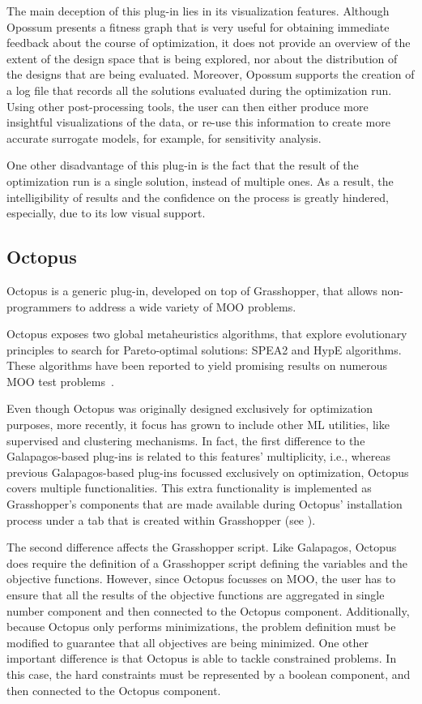 The main deception of this plug-in lies in its visualization features. Although Opossum presents a fitness graph that is very useful for obtaining immediate feedback about the course of optimization, it does not provide an overview of the extent of the design space that is being explored, nor about the distribution of the designs that are being evaluated. Moreover, Opossum supports the creation of a log file that records all the solutions evaluated during the optimization run. Using other post-processing tools, the user can then either produce more insightful visualizations of the data, or re-use this information to create more accurate surrogate models, for example, for sensitivity analysis.

One other disadvantage of this plug-in is the fact that the result of the optimization run is a single solution, instead of multiple ones. As a result, the intelligibility of results and the confidence on the process is greatly hindered, especially, due to its low visual support. 

\subsection{Octopus}

Octopus \cite{OCTOPUS} is a generic plug-in, developed on top of Grasshopper, that allows non-programmers to address a wide variety of \ac{MOO} problems. 

Octopus exposes two global metaheuristics algorithms, that explore evolutionary principles to search for Pareto-optimal solutions: \ac{SPEA2} and \ac{HypE} algorithms. These algorithms have been reported to yield promising results on numerous \ac{MOO} test problems~\cite{Zitzler2001SPEA2,Zitzler2011HypE}. 

Even though Octopus was originally designed exclusively for optimization purposes, more recently, it focus has grown to include other \ac{ML} utilities, like supervised and clustering mechanisms. In fact, the first difference to the Galapagos-based plug-ins is related to this features' multiplicity, i.e., whereas previous Galapagos-based plug-ins focussed exclusively on optimization, Octopus covers multiple functionalities. This extra functionality is implemented as Grasshopper's components that are made available during Octopus' installation process under a tab that is created within Grasshopper (see ).

The second difference affects the Grasshopper script. Like Galapagos, Octopus does require the definition of a Grasshopper script defining the variables and the objective functions. However, since Octopus focusses on \ac{MOO}, the user has to ensure that all the results of the objective functions are aggregated in single number component and then connected to the Octopus component. Additionally, because Octopus only performs minimizations, the problem definition must be modified to guarantee that all objectives are being minimized. One other important difference is that Octopus is able to tackle constrained problems. In this case, the hard constraints must be represented by a boolean component, and then connected to the Octopus component.


